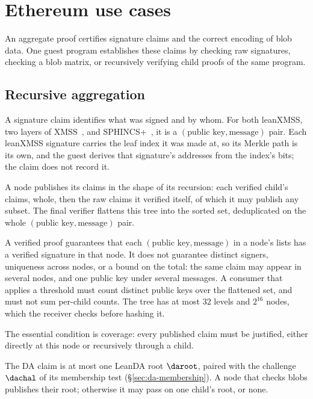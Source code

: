 \section{Ethereum use cases}\label{sec:ethereum}

An aggregate proof certifies signature claims and the correct encoding of blob data. One guest program establishes these claims by checking raw signatures, checking a blob matrix, or recursively verifying child proofs of the same program.

\subsection{Recursive aggregation}\label{sec:recursion}\label{sec:xmss-agg}\label{sec:sphincs-agg}

A signature claim identifies what was signed and by whom. For both leanXMSS, two layers of XMSS~\cite{rfc8391}, and SPHINCS+~\cite{sphincs}, it is a $(\text{public key},\text{message})$ pair. Each leanXMSS signature carries the leaf index it was made at, so its Merkle path is its own, and the guest derives that signature's addresses from the index's bits; the claim does not record it.

A node publishes its claims in the shape of its recursion: each verified child's claims, whole, then the raw claims it verified itself, of which it may publish any subset. The final verifier flattens this tree into the sorted set, deduplicated on the whole $(\text{public key},\text{message})$ pair.

A verified proof guarantees that each $(\text{public key},\text{message})$ in a node's lists has a verified signature in that node. It does not guarantee distinct signers, uniqueness across nodes, or a bound on the total: the same claim may appear in several nodes, and one public key under several messages. A consumer that applies a threshold must count distinct public keys over the flattened set, and must not sum per-child counts. The tree has at most $32$ levels and $2^{16}$ nodes, which the receiver checks before hashing it.

The essential condition is coverage: every published claim must be justified, either directly at this node or recursively through a child.

The DA claim is at most one LeanDA root $\daroot$, paired with the challenge $\dachal$ of its membership test (\S\ref{sec:da-membership}). A node that checks blobs publishes their root; otherwise it may pass on one child's root, or none.

